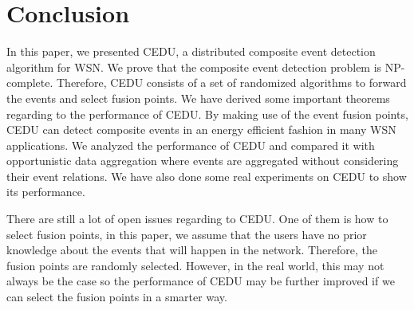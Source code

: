 \section{Conclusion}
\label{sec:conclusion}
In this paper, we presented CEDU, a distributed composite event detection algorithm for WSN. We prove that the composite event detection problem is NP-complete. Therefore, CEDU consists of a set of randomized algorithms to forward the events and select fusion points. We have derived some important theorems regarding to the performance of CEDU. By making use of the event fusion points, CEDU can detect composite events in an energy efficient fashion in many WSN applications. We analyzed the performance of CEDU and compared it with opportunistic data aggregation where events are aggregated without considering their event relations. We have also done some real experiments on CEDU to show its performance.

There are still a lot of open issues regarding to CEDU. One of them is how to select fusion points, in this paper, we assume that the users have no prior knowledge about the events that will happen in the network. Therefore, the fusion points are randomly selected. However, in the real world, this may not always be the case so the performance of CEDU may be further improved if we can select the fusion points in a smarter way.
